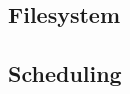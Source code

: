 \subsection{Filesystem}
\label{subsec:filesystem}




\subsection{Scheduling}
\label{subsec:scheduling}




